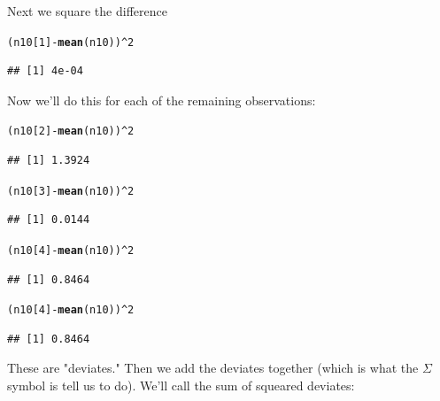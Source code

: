 \documentclass{tufte-handout}\usepackage[]{graphicx}\usepackage[]{color}
\makeatletter
\newcommand{\hlnum}[1]{\textcolor[rgb]{0.686,0.059,0.569}{#1}}%
\newcommand{\hlopt}[1]{\textcolor[rgb]{0,0,0}{#1}}%
\newcommand{\hlstd}[1]{\textcolor[rgb]{0.345,0.345,0.345}{#1}}%
\newcommand{\hlkwd}[1]{\textcolor[rgb]{0.737,0.353,0.396}{\textbf{#1}}}%
\newenvironment{kframe}{%
 \def\at@end@of@kframe{}%
 \ifinner\ifhmode%
  \def\at@end@of@kframe{\end{minipage}}%
  \begin{minipage}{\columnwidth}%
 \fi\fi%
 \def\FrameCommand##1{\hskip\@totalleftmargin \hskip-\fboxsep
 \colorbox{shadecolor}{##1}\hskip-\fboxsep
     \hskip-\linewidth \hskip-\@totalleftmargin \hskip\columnwidth}%
 \MakeFramed {\advance\hsize-\width
   \@totalleftmargin\z@ \linewidth\hsize
   \@setminipage}}%
 {\par\unskip\endMakeFramed%
 \at@end@of@kframe}
\newenvironment{knitrout}{}{} %
\makeatother
\begin{document}
Next we square the difference
\begin{knitrout}
\color{fgcolor}\begin{kframe}
\begin{alltt}
\hlstd{(n10[}\hlnum{1}\hlstd{]} \hlopt{-} \hlkwd{mean}\hlstd{(n10))}\hlopt{^}\hlnum{2}
\end{alltt}
\begin{verbatim}
## [1] 4e-04
\end{verbatim}
\end{kframe}
\end{knitrout}
\noindent Now we'll do this for each of the remaining observations:
\begin{knitrout}
\color{fgcolor}\begin{kframe}
\begin{alltt}
\hlstd{(n10[}\hlnum{2}\hlstd{]} \hlopt{-} \hlkwd{mean}\hlstd{(n10))}\hlopt{^}\hlnum{2}
\end{alltt}
\begin{verbatim}
## [1] 1.3924
\end{verbatim}
\begin{alltt}
\hlstd{(n10[}\hlnum{3}\hlstd{]} \hlopt{-} \hlkwd{mean}\hlstd{(n10))}\hlopt{^}\hlnum{2}
\end{alltt}
\begin{verbatim}
## [1] 0.0144
\end{verbatim}
\begin{alltt}
\hlstd{(n10[}\hlnum{4}\hlstd{]} \hlopt{-} \hlkwd{mean}\hlstd{(n10))}\hlopt{^}\hlnum{2}
\end{alltt}
\begin{verbatim}
## [1] 0.8464
\end{verbatim}
\begin{alltt}
\hlstd{(n10[}\hlnum{4}\hlstd{]} \hlopt{-} \hlkwd{mean}\hlstd{(n10))}\hlopt{^}\hlnum{2}
\end{alltt}
\begin{verbatim}
## [1] 0.8464
\end{verbatim}
\end{kframe}
\end{knitrout}
These are "deviates." Then we add the deviates together (which is what the $\Sigma$ symbol is tell us to do). We'll call the sum of squeared deviates:
\end{document}
